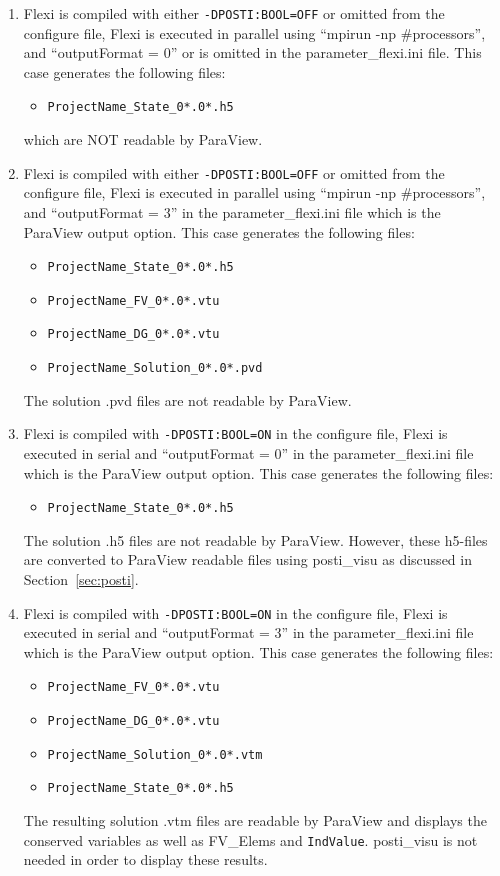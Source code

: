 \begin{appendices}
\begin{enumerate}
 \item Flexi is compiled with either \verb|-DPOSTI:BOOL=OFF| or omitted from the configure file, Flexi is executed in parallel using ``mpirun -np \#processors'', and ``outputFormat = 0'' or is omitted in the parameter\_flexi.ini file. This case generates the following files:
 \begin{itemize}
  \item \verb|ProjectName_State_0*.0*.h5|
 \end{itemize}
\noindent which are NOT readable by ParaView.

\item Flexi is compiled with either \verb|-DPOSTI:BOOL=OFF| or omitted from the configure file, Flexi is executed in parallel using ``mpirun -np \#processors'', and ``outputFormat = 3'' in the parameter\_flexi.ini file which is the ParaView output option. This case generates the following files:
 \begin{itemize}
  \item \verb|ProjectName_State_0*.0*.h5|
  \item \verb|ProjectName_FV_0*.0*.vtu|
  \item \verb|ProjectName_DG_0*.0*.vtu|
  \item \verb|ProjectName_Solution_0*.0*.pvd|
 \end{itemize}
\noindent  The solution .pvd files are not readable by ParaView.

\item Flexi is compiled with \verb|-DPOSTI:BOOL=ON| in the configure file, Flexi is executed in serial and ``outputFormat = 0'' in the parameter\_flexi.ini file which is the ParaView output option. This case generates the following files:
 \begin{itemize}
  \item \verb|ProjectName_State_0*.0*.h5|
 \end{itemize}
\noindent  The solution .h5 files are not readable by ParaView. However, these h5-files are converted to ParaView readable files using posti\_visu as discussed in Section~\ref{sec:posti}.

\item Flexi is compiled with \verb|-DPOSTI:BOOL=ON| in the configure file, Flexi is executed in serial and ``outputFormat = 3'' in the parameter\_flexi.ini file which is the ParaView output option. This case generates the following files:
 \begin{itemize}
  \item \verb|ProjectName_FV_0*.0*.vtu|
  \item \verb|ProjectName_DG_0*.0*.vtu|
  \item \verb|ProjectName_Solution_0*.0*.vtm|
  \item \verb|ProjectName_State_0*.0*.h5|
 \end{itemize}
\noindent  The resulting solution .vtm files are readable by ParaView and displays the conserved variables as well as FV\_Elems and \verb|IndValue|.  posti\_visu is not needed in order to display these results.


\end{enumerate}
\end{appendices}
